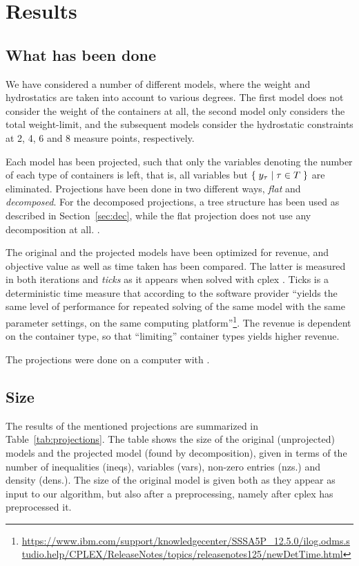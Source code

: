 %
%

\section{Results}
\subsection{What has been done}
We have considered a number of different models, where the weight and hydrostatics are taken into account to various degrees. The first model does not consider the weight of the containers at all, the second model only considers the total weight-limit, and the subsequent models consider the hydrostatic constraints at 2, 4, 6 and 8 measure points, respectively.

Each model has been projected, such that only the variables denoting the number of each type of containers is left, that is, all variables but $\{\;{y_\tau}\;|\;{\tau\in T}\;\}$  are eliminated. 
Projections have been done in two different ways, \emph{flat} and \emph{decomposed}. For the decomposed projections, a tree structure has been used as described in Section~\ref{sec:dec}, while the flat projection does not use any decomposition at all. . 

The original and the projected models have been optimized for revenue, and objective value as well as time taken has been compared. The latter is measured in both iterations and \emph{ticks} as it appears when solved with cplex . Ticks is a deterministic time measure that according to the software provider ``yields the same level of performance for repeated solving of the same model with the same parameter settings, on the same computing platform''\footnote{\url{https://www.ibm.com/support/knowledgecenter/SSSA5P_12.5.0/ilog.odms.studio.help/CPLEX/ReleaseNotes/topics/releasenotes125/newDetTime.html}}. 
The revenue is dependent on the container type, so that ``limiting'' container types yields higher revenue. %

The projections were done on a  computer with  .
\subsection{Size}
The results of the mentioned projections are summarized in Table~\ref{tab:projections}. The table shows the size of the original (unprojected) models and the projected model (found by decomposition), given in terms of the number of inequalities (ineqs), variables (vars), non-zero entries (nzs.) and density (dens.). The size of the original model is given both as they appear as input to our algorithm, but also after a  preprocessing, namely after cplex has preprocessed it. 

